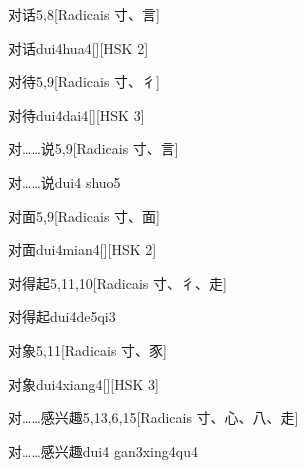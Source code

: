 \begin{entry}{对话}{5,8}[Radicais ⼨、⾔]
  \begin{phonetics}{对话}{dui4hua4}[][HSK 2]
  \end{phonetics}
\end{entry}

\begin{entry}{对待}{5,9}[Radicais ⼨、⼻]
  \begin{phonetics}{对待}{dui4dai4}[][HSK 3]
  \end{phonetics}
\end{entry}

\begin{entry}{对……说}{5,9}[Radicais ⼨、⾔]
  \begin{phonetics}{对……说}{dui4 shuo5}
  \end{phonetics}
\end{entry}

\begin{entry}{对面}{5,9}[Radicais ⼨、⾯]
  \begin{phonetics}{对面}{dui4mian4}[][HSK 2]
  \end{phonetics}
\end{entry}

\begin{entry}{对得起}{5,11,10}[Radicais ⼨、⼻、⾛]
  \begin{phonetics}{对得起}{dui4de5qi3}
  \end{phonetics}
\end{entry}

\begin{entry}{对象}{5,11}[Radicais ⼨、⾗]
  \begin{phonetics}{对象}{dui4xiang4}[][HSK 3]
  \end{phonetics}
\end{entry}

\begin{entry}{对……感兴趣}{5,13,6,15}[Radicais ⼨、⼼、⼋、⾛]
  \begin{phonetics}{对……感兴趣}{dui4 gan3xing4qu4}
  \end{phonetics}
\end{entry}

